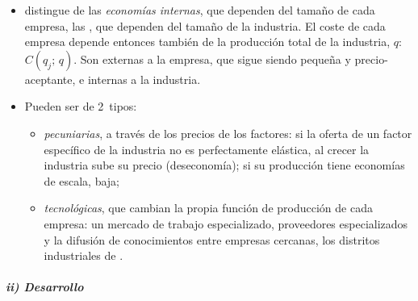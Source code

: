 \documentclass[11pt]{article}
\begin{document}
\begin{itemize}
\item \textcite[libro~IV, caps.~IX-XIII]{Marshall1890Principles} distingue de las \emph{economías internas}, que dependen del tamaño de cada empresa, las , que dependen del tamaño de la industria. El coste de cada empresa depende entonces también de la producción total de la industria, $q$: $C(q_j;\,q)$. Son externas a la empresa, que sigue siendo pequeña y precio-aceptante, e internas a la industria.
\item Pueden ser de 2~tipos\nocite{Viner1931Cost,Scitovsky1954Two}:
  \begin{itemize}
  \item \emph{pecuniarias}, a través de los precios de los factores: si la oferta de un factor específico de la industria no es perfectamente elástica, al crecer la industria sube su precio (deseconomía); si su producción tiene economías de escala, baja;
  \item \emph{tecnológicas}, que cambian la propia función de producción de cada empresa: un mercado de trabajo especializado, proveedores especializados y la difusión de conocimientos entre empresas cercanas, los distritos industriales de .
  \end{itemize}
\end{itemize}

\subparagraph{ii) Desarrollo}
\end{document}
